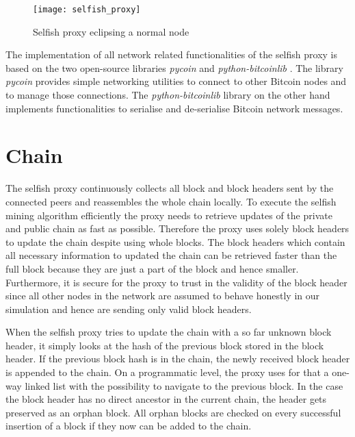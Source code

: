 \begin{figure}
	\centering
    \texttt{[image: selfish\_proxy]}
    \caption{Selfish proxy eclipsing a normal node}
    \label{fig:selfish_proxy}
\end{figure}

The implementation of all network related functionalities of the selfish proxy is based on the two open-source libraries \textit{pycoin} \cite{pycoin} and \textit{python-bitcoinlib} \cite{python-bitcoinlib}.
The library \textit{pycoin} provides simple networking utilities to connect to other Bitcoin nodes and to manage those connections. 
The \textit{python-bitcoinlib} library on the other hand implements functionalities to serialise and de-serialise Bitcoin network messages.

\section{Chain}

The selfish proxy continuously collects all block and block headers sent by the connected peers and reassembles the whole chain locally.
To execute the selfish mining algorithm efficiently the proxy needs to retrieve updates of the private and public chain as fast as possible.
Therefore the proxy uses solely block headers to update the chain despite using whole blocks.
The block headers which contain all necessary information to updated the chain can be retrieved faster than the full block because they are just a part of the block and hence smaller.
Furthermore, it is secure for the proxy to trust in the validity of the block header since all other nodes in the network are assumed to behave honestly in our simulation and hence are sending only valid block headers.

When the selfish proxy tries to update the chain with a so far unknown block header, it simply looks at the hash of the previous block stored in the block header.
If the previous block hash is in the chain, the newly received block header is appended to the chain.
On a programmatic level, the proxy uses for that a one-way linked list with the possibility to navigate to the previous block.
In the case the block header has no direct ancestor in the current chain, the header gets preserved as an orphan block.
All orphan blocks are checked on every successful insertion of a block if they now can be added to the chain.

